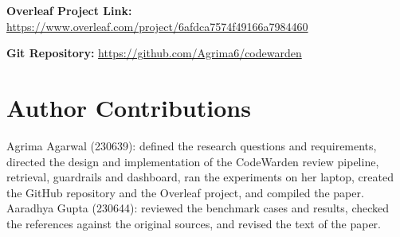 \author{Group 01: Agrima Agarwal (230639), Aaradhya Gupta (230644), Naveen Singh/Kiran Khatter\\
School of Engineering \& Technology, BML Munjal University}

\noindent\textbf{Overleaf Project Link:} \url{https://www.overleaf.com/project/6afdca7574f49166a7984460}

\noindent\textbf{Git Repository:} \url{https://github.com/Agrima6/codewarden}

\section*{Author Contributions}
Agrima Agarwal (230639): defined the research questions and requirements, directed the design and implementation of the CodeWarden review pipeline, retrieval, guardrails and dashboard, ran the experiments on her laptop, created the GitHub repository and the Overleaf project, and compiled the paper.\\
Aaradhya Gupta (230644): reviewed the benchmark cases and results, checked the references against the original sources, and revised the text of the paper. %
